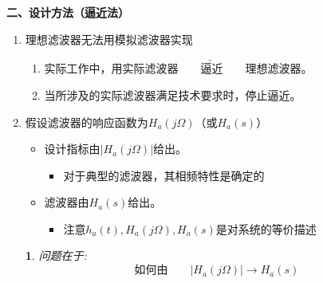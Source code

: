 \documentclass[notheorems,compress,mathserif,table]{beamer}
\newtheorem{dablock}{}
\begin{document}
\begin{frame}[shrink]\frametitle{}%

\textbf{\heiti 二、设计方法（逼近法）}

\begin{enumerate}
      \item  [1]  理想滤波器无法用模拟滤波器实现
          \begin{enumerate}
            \item [(1)] 实际工作中，用实际滤波器$\quad\underrightarrow{\quad\mbox{逼近}
                \quad}\quad$理想滤波器。
            \item [(2)] 当所涉及的实际滤波器满足技术要求时，停止逼近。
          \end{enumerate}
          \par\quad%
      \item  [2]   假设滤波器的响应函数为$H_{a}(j\Omega)$\quad （或$H_{a}(s)$）
          \par
               \begin{itemize}
                 \item [(1)]设计指标由$|H_{a}(j\Omega)|$给出。
                     \begin{itemize}
                       \item 对于典型的滤波器，其相频特性是确定的
                     \end{itemize}

                 \item [(2)]滤波器由$H_{a}(s)$给出。
                     \begin{itemize}
                       \item 注意$h_a(t),H_a(j\Omega),H_a(s)$是对系统的等价描述
                     \end{itemize}
               \end{itemize}
\begin{dablock}
问题在于:
$$\mbox{如何由}\quad\quad \left|H_{a}(j\Omega)\right| \longrightarrow H_{a}(s)$$
\quad\newline\quad
\end{dablock}
\end{enumerate}
\end{frame}
\end{document}
